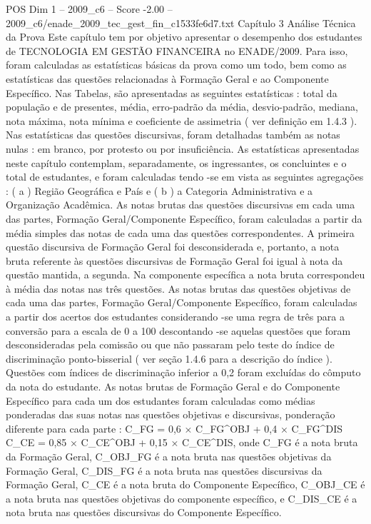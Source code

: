 \begin{textsample}{POS Dim 1 – 2009\_c6 – Score -2.00 – 2009\_c6/enade\_2009\_tec\_gest\_fin\_c1533fe6d7.txt}  \label{ex:f1_pos_230}
Capítulo 3 Análise Técnica da Prova Este capítulo tem por objetivo apresentar o desempenho dos estudantes de TECNOLOGIA EM GESTÃO FINANCEIRA no ENADE/2009.
Para isso, foram calculadas as estatísticas básicas da prova como um todo, bem como as estatísticas das questões relacionadas à Formação Geral e ao Componente Específico.
Nas Tabelas, são apresentadas as seguintes estatísticas : total da população e de presentes, média, erro-padrão da média, desvio-padrão, mediana, nota máxima, nota mínima e coeficiente de assimetria ( ver definição em 1.4.3 ).
Nas estatísticas das questões discursivas, foram detalhadas também as notas nulas : em branco, por protesto ou por insuficiência.
As estatísticas apresentadas neste capítulo contemplam, separadamente, os ingressantes, os concluintes e o total de estudantes, e foram calculadas tendo -se em vista as seguintes agregações : ( a ) Região Geográfica e País e ( b ) a Categoria Administrativa e a Organização Acadêmica.
As notas brutas das questões discursivas em cada uma das partes, Formação Geral/Componente Específico, foram calculadas a partir da média simples das notas de cada uma das questões correspondentes.
A primeira questão discursiva de Formação Geral foi desconsiderada e, portanto, a nota bruta referente às questões discursivas de Formação Geral foi igual à nota da questão mantida, a segunda.
Na componente específica a nota bruta correspondeu à média das notas nas três questões.
As notas brutas das questões objetivas de cada uma das partes, Formação Geral/Componente Específico, foram calculadas a partir dos acertos dos estudantes considerando -se uma regra de três para a conversão para a escala de 0 a 100 descontando -se aquelas questões que foram desconsideradas pela comissão ou que não passaram pelo teste do índice de discriminação ponto-bisserial ( ver seção 1.4.6 para a descrição do índice ).
Questões com índices de discriminação inferior a 0,2 foram excluídas do cômputo da nota do estudante.
As notas brutas de Formação Geral e do Componente Específico para cada um dos estudantes foram calculadas como médias ponderadas das suas notas nas questões objetivas e discursivas, ponderação diferente para cada parte : C\_FG = 0,6 × C\_FG\textasciicircum{}OBJ + 0,4 × C\_FG\textasciicircum{}DIS C\_CE = 0,85 × C\_CE\textasciicircum{}OBJ + 0,15 × C\_CE\textasciicircum{}DIS, onde C\_FG é a nota bruta da Formação Geral, C\_OBJ\_FG é a nota bruta nas questões objetivas da Formação Geral, C\_DIS\_FG é a nota bruta nas questões discursivas da Formação Geral, C\_CE é a nota bruta do Componente Específico, C\_OBJ\_CE é a nota bruta nas questões objetivas do componente específico, e C\_DIS\_CE é a nota bruta nas questões discursivas do Componente Específico.

\end{textsample}
